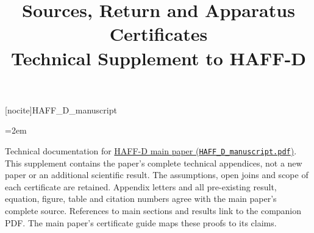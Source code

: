 
[nocite]{HAFF_D_manuscript}
\title{Sources, Return and Apparatus Certificates\\[4pt]\large Technical Supplement to HAFF-D}

\emergencystretch=2em
\raggedbottom
{}
\renewcommand{\thepage}{S\arabic{page}}
\maketitle
\noindent Technical documentation for \href{HAFF_D_manuscript.pdf}{HAFF-D main paper (\texttt{HAFF\_D\_manuscript.pdf})}. This supplement contains the paper's complete technical appendices, not a new paper or an additional scientific result. The assumptions, open joins and scope of each certificate are retained. Appendix letters and all pre-existing result, equation, figure, table and citation numbers agree with the main paper's complete source. References to main sections and results link to the companion PDF. The main paper's certificate guide maps these proofs to its claims.
\clearpage
\setcounter{theorem}{0}
\setcounter{equation}{31}
\setcounter{figure}{0}
\setcounter{table}{1}
\setcounter{footnote}{0}
\appendix



